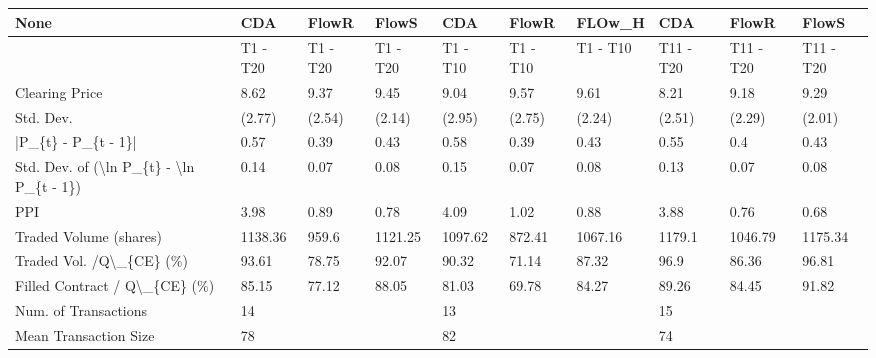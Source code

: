 \begin{tabular}{llllllllll}
\hline
 None                                                      & CDA      & FlowR    & FlowS    & CDA      & FlowR    & FLOw\_H   & CDA       & FlowR     & FlowS     \\
\hline
                                                           & T1 - T20 & T1 - T20 & T1 - T20 & T1 - T10 & T1 - T10 & T1 - T10 & T11 - T20 & T11 - T20 & T11 - T20 \\
 Clearing Price                                            & 8.62     & 9.37     & 9.45     & 9.04     & 9.57     & 9.61     & 8.21      & 9.18      & 9.29      \\
 Std. Dev.                                                 & (2.77)   & (2.54)   & (2.14)   & (2.95)   & (2.75)   & (2.24)   & (2.51)    & (2.29)    & (2.01)    \\
 |P\_\{t\} - P\_\{t - 1\}|                                       & 0.57     & 0.39     & 0.43     & 0.58     & 0.39     & 0.43     & 0.55      & 0.4       & 0.43      \\
 Std. Dev. of (\textbackslash{}ln P\_\{t\} - \textbackslash{}ln P\_\{t - 1\})                  & 0.14     & 0.07     & 0.08     & 0.15     & 0.07     & 0.08     & 0.13      & 0.07      & 0.08      \\
 PPI                                                       & 3.98     & 0.89     & 0.78     & 4.09     & 1.02     & 0.88     & 3.88      & 0.76      & 0.68      \\
 Traded Volume (shares)                                    & 1138.36  & 959.6    & 1121.25  & 1097.62  & 872.41   & 1067.16  & 1179.1    & 1046.79   & 1175.34   \\
 Traded Vol. /Q\textbackslash{}\_\{CE\} (\%)                                  & 93.61    & 78.75    & 92.07    & 90.32    & 71.14    & 87.32    & 96.9      & 86.36     & 96.81     \\
 Filled Contract / Q\textbackslash{}\_\{CE\} (\%)                             & 85.15    & 77.12    & 88.05    & 81.03    & 69.78    & 84.27    & 89.26     & 84.45     & 91.82     \\
 Num. of Transactions                                      & 14       &          &          & 13       &          &          & 15        &           &           \\
 Mean Transaction Size                                     & 78       &          &          & 82       &          &          & 74        &           &           \\

\end{tabular}
